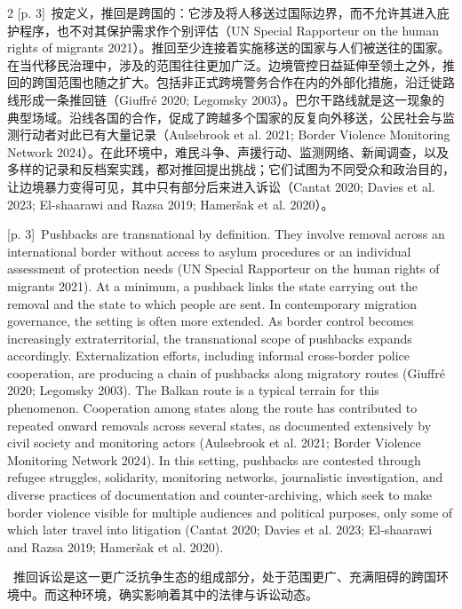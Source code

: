 \documentclass[10pt,a4paper]{article}
\begin{document}
\begin{paracol}{2}
{\scriptsize\color{gray} [p. 3]}\ 按定义，推回是跨国的：它涉及将人移送过国际边界，而不允许其进入庇护程序，也不对其保护需求作个别评估（UN Special Rapporteur on the human rights of migrants 2021）。推回至少连接着实施移送的国家与人们被送往的国家。在当代移民治理中，涉及的范围往往更加广泛。边境管控日益延伸至领土之外，推回的跨国范围也随之扩大。包括非正式跨境警务合作在内的外部化措施，沿迁徙路线形成一条推回链（Giuffré 2020; Legomsky 2003）。巴尔干路线就是这一现象的典型场域。沿线各国的合作，促成了跨越多个国家的反复向外移送，公民社会与监测行动者对此已有大量记录（Aulsebrook et al. 2021; Border Violence Monitoring Network 2024）。在此环境中，难民斗争、声援行动、监测网络、新闻调查，以及多样的记录和反档案实践，都对推回提出挑战；它们试图为不同受众和政治目的，让边境暴力变得可见，其中只有部分后来进入诉讼（Cantat 2020; Davies et al. 2023; El-shaarawi and Razsa 2019; Hameršak et al. 2020）。\par
\switchcolumn
{\scriptsize\color{gray} [p. 3]}\ Pushbacks are transnational by definition. They involve removal across an international border without access to asylum procedures or an individual assessment of protection needs (UN Special Rapporteur on the human rights of migrants 2021). At a minimum, a pushback links the state carrying out the removal and the state to which people are sent. In contemporary migration governance, the setting is often more extended. As border control becomes increasingly extraterritorial, the transnational scope of pushbacks expands accordingly. Externalization efforts, including informal cross-border police cooperation, are producing a chain of pushbacks along migratory routes (Giuffré 2020; Legomsky 2003). The Balkan route is a typical terrain for this phenomenon. Cooperation among states along the route has contributed to repeated onward removals across several states, as documented extensively by civil society and monitoring actors (Aulsebrook et al. 2021; Border Violence Monitoring Network 2024). In this setting, pushbacks are contested through refugee struggles, solidarity, monitoring networks, journalistic investigation, and diverse practices of documentation and counter-archiving, which seek to make border violence visible for multiple audiences and political purposes, only some of which later travel into litigation (Cantat 2020; Davies et al. 2023; El-shaarawi and Razsa 2019; Hameršak et al. 2020).\par
\switchcolumn*
{\scriptsize\color{gray} [p. 3]}\ 推回诉讼是这一更广泛抗争生态的组成部分，处于范围更广、充满阻碍的跨国环境中。而这种环境，确实影响着其中的法律与诉讼动态。\par

\end{paracol}
\end{document}
